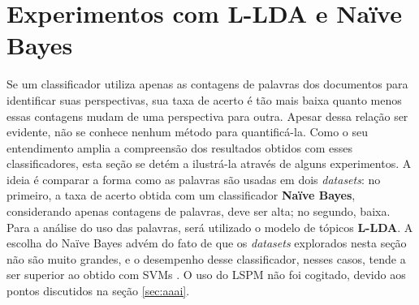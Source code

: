 


\section{Experimentos com L-LDA e Naïve Bayes}
\label{freqs:experim}

Se um classificador utiliza apenas as contagens de palavras dos documentos para identificar suas perspectivas, sua taxa de acerto é tão mais baixa quanto menos essas contagens mudam de uma perspectiva para outra. Apesar dessa relação ser evidente, não se conhece nenhum método para quantificá-la. Como o seu entendimento amplia a compreensão dos resultados obtidos com esses classificadores, esta seção se detém a ilustrá-la através de alguns experimentos. A ideia é comparar a forma como as palavras são usadas em dois \emph{datasets}: no primeiro, a taxa de acerto obtida com um classificador \textbf{Naïve Bayes}, considerando apenas contagens de palavras, deve ser alta; no segundo, baixa. Para a análise do uso das palavras, será utilizado o modelo de tópicos \textbf{L-LDA}. A escolha do Naïve Bayes advém do fato de que os \emph{datasets} explorados nesta seção não são muito grandes, e o desempenho desse classificador, nesses casos, tende a ser superior ao obtido com SVMs \cite{ng-jordan}. O uso do LSPM não foi cogitado, devido aos pontos discutidos na seção \ref{sec:aaai}.

